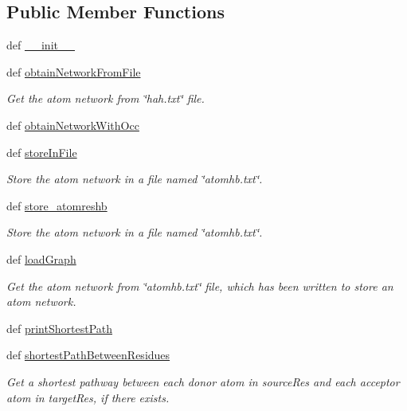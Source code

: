 \subsection*{Public Member Functions}
\begin{DoxyCompactItemize}
\item 
def \hyperlink{classatom__hbond_1_1_atom_net_a2aa26477e40c03bf66d516543af1ae94}{\-\_\-\-\_\-init\-\_\-\-\_\-}
\item 
def \hyperlink{classatom__hbond_1_1_atom_net_ace5c54516014e2987b5335b85bfec60d}{obtain\-Network\-From\-File}
\begin{DoxyCompactList}\small\item\em Get the atom network from \char`\"{}hah.\-txt\char`\"{} file. \end{DoxyCompactList}\item 
def \hyperlink{classatom__hbond_1_1_atom_net_a7cdc5e4dfc0d48c1312520fddf1ba3c0}{obtain\-Network\-With\-Occ}
\item 
def \hyperlink{classatom__hbond_1_1_atom_net_ac8b24f543113377688d1a2b9ed0f9c89}{store\-In\-File}
\begin{DoxyCompactList}\small\item\em Store the atom network in a file named \char`\"{}atomhb.\-txt\char`\"{}. \end{DoxyCompactList}\item 
def \hyperlink{classatom__hbond_1_1_atom_net_af218b8037988a7ba5df0e158981dd890}{store\-\_\-atomreshb}
\begin{DoxyCompactList}\small\item\em Store the atom network in a file named \char`\"{}atomhb.\-txt\char`\"{}. \end{DoxyCompactList}\item 
def \hyperlink{classatom__hbond_1_1_atom_net_a14de518f576bf0a42a6017d9ab62ba7d}{load\-Graph}
\begin{DoxyCompactList}\small\item\em Get the atom network from \char`\"{}atomhb.\-txt\char`\"{} file, which has been written to store an atom network. \end{DoxyCompactList}\item 
def \hyperlink{classatom__hbond_1_1_atom_net_ae66207e59bb231d976218a04c183c088}{print\-Shortest\-Path}
\item 
def \hyperlink{classatom__hbond_1_1_atom_net_accacb11bbd9165cabde21f8c7765fd30}{shortest\-Path\-Between\-Residues}
\begin{DoxyCompactList}\small\item\em Get a shortest pathway between each donor atom in source\-Res and each acceptor atom in target\-Res, if there exists. \end{DoxyCompactList}\end{DoxyCompactItemize}

